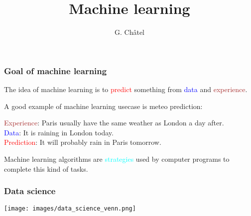 \documentclass[9pt]{beamer}
\title{Machine learning}
\author{G. Châtel}
\date{}
\begin{document}
\begin{frame}

  \maketitle

\end{frame}

\begin{frame}
  \frametitle{Goal of machine learning}


  The idea of machine learning is to \textcolor{red}{predict}
  something from \textcolor{blue}{data} and
  \textcolor{brown}{experience}.

  \bigskip

  A good example of machine learning usecase is meteo prediction:

  \textcolor{brown}{Experience}: Paris usually have the same weather
  as London a day after.\\
  \textcolor{blue}{Data}: It is raining in London today.\\
  \textcolor{red}{Prediction}: It will probably rain in Paris tomorrow.

  \bigskip

  Machine learning algorithms are \textcolor{cyan}{strategies} used by
  computer programs to complete this kind of tasks.
\end{frame}

\begin{frame}
  \frametitle{Data science}

  \begin{center}
    \texttt{[image: images/data\_science\_venn.png]}
  \end{center}

\end{frame}

\end{document}
